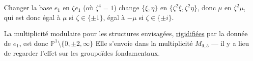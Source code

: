 
Changer la base  \(e_1\) en \(\zeta e_1\) (où \(\zeta^4=1\))
 change 
\(\{\xi,\eta\}\) en \(\{\zeta^2\xi,\zeta^2\eta\}\),
donc \(\mu\) en \(\zeta^2\mu\), qui est donc
égal à \(\mu\) si \(\zeta\in\{\pm1\}\), égal à \(-\mu\) si
\(\zeta\in\{\pm i\}\).

La multiplicité modulaire pour les
structures envisagées, \uline{rigidifiées} par la
donnée de \(e_1\), est donc \(\mathbb P^1\setminus\{0,\pm2,\infty\}\)
Elle s'envoie dans la multiplicité
\(M_{0,5}\) --- il y a lieu de regarder l'effet
sur les groupoïdes fondamentaux.

